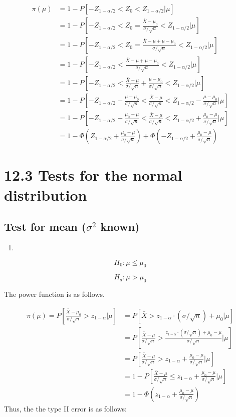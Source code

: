 \documentclass[]{book}
\begin{document}
\[\begin{aligned} \pi(\mu) &=1-P[-Z_{1-\alpha/2} < Z_0 < Z_{1-\alpha/2}| \mu] \\ &=1-P[-Z_{1-\alpha/2} < Z_0=\frac{\bar{X}-\mu_0}{\sigma/\sqrt{n}} < Z_{1-\alpha/2}| \mu] \\ &=1-P[-Z_{1-\alpha/2} < Z_0=\frac{\bar{X}-\mu+\mu-\mu_0}{\sigma/\sqrt{n}} < Z_{1-\alpha/2}| \mu] \\ &=1-P[-Z_{1-\alpha/2} < \frac{\bar{X}-\mu+\mu-\mu_0}{\sigma/\sqrt{n}} < Z_{1-\alpha/2}| \mu] \\ &=1-P[-Z_{1-\alpha/2} < \frac{\bar{X}-\mu}{\sigma/\sqrt{n}}+\frac{\mu-\mu_0}{\sigma/\sqrt{n}} < Z_{1-\alpha/2}| \mu] \\ &=1-P[-Z_{1-\alpha/2}-\frac{\mu-\mu_0}{\sigma/\sqrt{n}} < \frac{\bar{X}-\mu}{\sigma/\sqrt{n}} < Z_{1-\alpha/2}-\frac{\mu-\mu_0}{\sigma/\sqrt{n}}| \mu] \\ &=1-P[-Z_{1-\alpha/2}+\frac{\mu_0-\mu}{\sigma/\sqrt{n}} < \frac{\bar{X}-\mu}{\sigma/\sqrt{n}} < Z_{1-\alpha/2}+\frac{\mu_0-\mu}{\sigma/\sqrt{n}}| \mu] \\&=1-\Phi(Z_{1-\alpha/2}+\frac{\mu_0-\mu}{\sigma/\sqrt{n}})+\Phi(-Z_{1-\alpha/2}+\frac{\mu_0-\mu}{\sigma/\sqrt{n}}) \end{aligned}\]

\hypertarget{tests-for-the-normal-distribution}{%
\section{12.3 Tests for the normal distribution}\label{tests-for-the-normal-distribution}}

\hypertarget{test-for-mean-sigma2-known}{%
\subsection{\texorpdfstring{Test for mean (\(\sigma^2\) known)}{Test for mean (\textbackslash sigma\^{}2 known)}}\label{test-for-mean-sigma2-known}}

\begin{enumerate}
\def\labelenumi{(\arabic{enumi})}
\item
\end{enumerate}

\[H_0: \mu \leq \mu_0\]

\[H_a: \mu > \mu_0\]

The power function is as follows.

\[\begin{aligned} \pi(\mu)=P[\frac{\bar{X}-\mu_0}{\sigma/\sqrt{n}}> z_{1-\alpha} |\mu] &=P[\bar{X} > z_{1-\alpha} \cdot (\sigma/\sqrt{n})+\mu_0 |\mu] \\ &=P[\frac{\bar{X}-\mu}{\sigma/\sqrt{n}} > \frac{z_{1-\alpha} \cdot (\sigma/\sqrt{n})+\mu_0-\mu}{\sigma/\sqrt{n}} |\mu] \\ &=P[\frac{\bar{X}-\mu}{\sigma/\sqrt{n}} > z_{1-\alpha} +\frac{ \mu_0-\mu}{\sigma/\sqrt{n}} |\mu] \\ &=1-P[\frac{\bar{X}-\mu}{\sigma/\sqrt{n}} \leq z_{1-\alpha} +\frac{ \mu_0-\mu}{\sigma/\sqrt{n}} |\mu] \\ &=1-\Phi(z_{1-\alpha} +\frac{ \mu_0-\mu}{\sigma/\sqrt{n}} )\end{aligned} \]
Thus, the the type II error is as follows:
\end{document}
